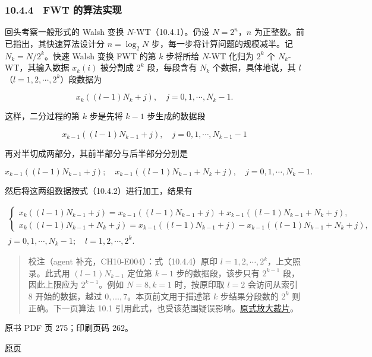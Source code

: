 \subsubsection{10.4.4　FWT 的算法实现}\label{ch10-fwt-ux7684ux7b97ux6cd5ux5b9eux73b0}

回头考察一般形式的 Walsh 变换 \(N\)-WT（10.4.1）。仍设 \(N=2^n\)，\(n\) 为正整数。前已指出，其快速算法设计分 \(n=\log_2N\) 步，每一步将计算问题的规模减半。记 \(N_k=N/2^k\)。快速 Walsh 变换 FWT 的第 \(k\) 步将所给 \(N\)-WT 化归为 \(2^k\) 个 \(N_k\)-WT，其输入数据 \(x_k(i)\) 被分割成 \(2^k\) 段，每段含有 \(N_k\) 个数据，具体地说，其 \(l\)（\(l=1,2,\cdots,2^k\)）段数据为

\[
x_k((l-1)N_k+j),\quad j=0,1,\cdots,N_k-1.
\]

这样，二分过程的第 \(k\) 步是先将 \(k-1\) 步生成的数据段

\[
x_{k-1}((l-1)N_{k-1}+j),\quad j=0,1,\cdots,N_{k-1}-1
\]

再对半切成两部分，其前半部分与后半部分分别是

\[
x_{k-1}((l-1)N_{k-1}+j);\quad x_{k-1}((l-1)N_{k-1}+N_k+j),\quad j=0,1,\cdots,N_k-1.
\]

然后将这两组数据按式（10.4.2）进行加工，结果有

\[
\begin{gathered}
\begin{cases}
x_k((l-1)N_{k-1}+j)=x_{k-1}((l-1)N_{k-1}+j)+x_{k-1}((l-1)N_{k-1}+N_k+j),\\
x_k((l-1)N_{k-1}+N_k+j)=x_{k-1}((l-1)N_{k-1}+j)-x_{k-1}((l-1)N_{k-1}+N_k+j),
\end{cases}\\
j=0,1,\cdots,N_k-1;\quad l=1,2,\cdots,2^k.
\end{gathered}
\tag{10.4.4}
\]

\begin{quote}
校注（agent 补充，CH10-E004）：式（10.4.4）原印 \(l=1,2,\cdots,2^k\)，上文照录。此式用 \((l-1)N_{k-1}\) 定位第 \(k-1\) 步的数据段，该步只有 \(2^{k-1}\) 段，因此上限应为 \(2^{k-1}\)。例如 \(N=8,k=1\) 时，按原印取 \(l=2\) 会访问从索引 8 开始的数据，越过 \(0,\ldots,7\)。本页前文用于描述第 \(k\) 步结果分段数的 \(2^k\) 则正确。下一页算法 10.1 引用此式，也受该范围疑误影响。\href{verified/assets/ch10/erratum-p274-range.png}{原式放大裁片}。
\end{quote}

\clearpage

原书 PDF 页 275；印刷页码 262。

\href{source-images/pdf-275.jpeg}{原页}

